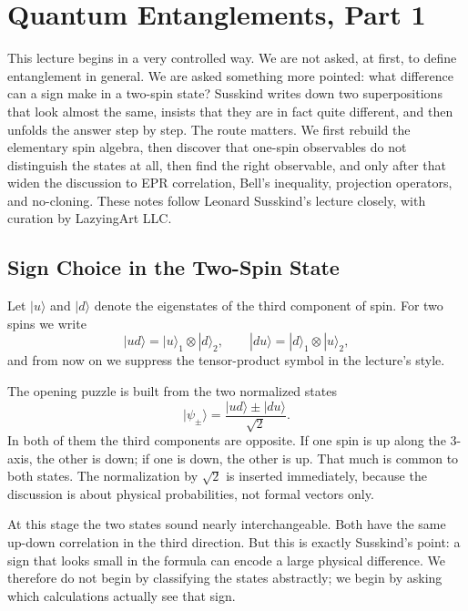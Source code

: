\chapter{Quantum Entanglements, Part 1}

This lecture begins in a very controlled way. We are not asked, at first, to define entanglement in general. We are asked something more pointed: what difference can a sign make in a two-spin state? Susskind writes down two superpositions that look almost the same, insists that they are in fact quite different, and then unfolds the answer step by step. The route matters. We first rebuild the elementary spin algebra, then discover that one-spin observables do not distinguish the states at all, then find the right observable, and only after that widen the discussion to EPR correlation, Bell's inequality, projection operators, and no-cloning. These notes follow Leonard Susskind's lecture closely, with curation by LazyingArt LLC.

\section{Sign Choice in the Two-Spin State}

Let \(|u\rangle\) and \(|d\rangle\) denote the eigenstates of the third component of spin. For two spins we write
\[
|ud\rangle = |u\rangle_1\otimes |d\rangle_2,
\qquad
|du\rangle = |d\rangle_1\otimes |u\rangle_2,
\]
and from now on we suppress the tensor-product symbol in the lecture's style.

The opening puzzle is built from the two normalized states
\begin{equation}
|\psi_{\pm}\rangle
=
\frac{|ud\rangle \pm |du\rangle}{\sqrt{2}}.
\end{equation}
In both of them the third components are opposite. If one spin is up along the \(3\)-axis, the other is down; if one is down, the other is up. That much is common to both states. The normalization by \(\sqrt{2}\) is inserted immediately, because the discussion is about physical probabilities, not formal vectors only.

At this stage the two states sound nearly interchangeable. Both have the same up-down correlation in the third direction. But this is exactly Susskind's point: a sign that looks small in the formula can encode a large physical difference. We therefore do not begin by classifying the states abstractly; we begin by asking which calculations actually see that sign.

